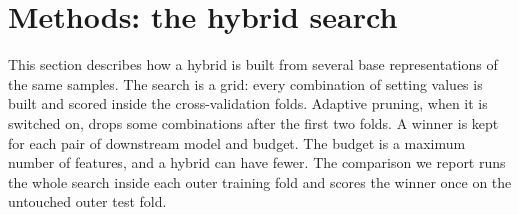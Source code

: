 \section{Methods: the hybrid search}

This section describes how a hybrid is built from several base representations of the same samples. The search is a grid: every combination of setting values is built and scored inside the cross-validation folds. Adaptive pruning, when it is switched on, drops some combinations after the first two folds. A winner is kept for each pair of downstream model and budget. The budget is a maximum number of features, and a hybrid can have fewer. The comparison we report runs the whole search inside each outer training fold and scores the winner once on the untouched outer test fold.


